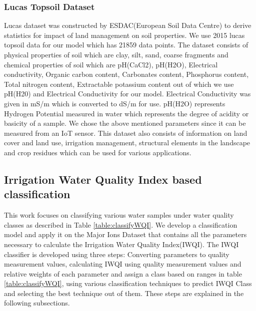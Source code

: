 \subsubsection{Lucas Topsoil Dataset}
\label{subsubsection:lucas}
Lucas dataset  was constructed by ESDAC(European Soil Data Centre) to derive statistics for impact of land management on soil properties\cite{dataset:lucas}. We use 2015 lucas topsoil data for our model which has 21859 data points. The dataset consists of physical properties of soil which are clay, silt, sand, coarse fragments and chemical properties of soil which are pH(CaCl2), pH(H2O), Electrical conductivity, Organic carbon content, Carbonates content, Phosphorus content, Total nitrogen content, Extractable potassium content out of which we use pH(H20) and Electrical Conductivity for our model. Electrical Conductivity was given in mS/m which is converted to dS/m for use. pH(H2O) represents Hydrogen Potential measured in water which represents the degree of acidity or basicity of a sample. We chose the above mentioned parameters since it can be measured from an IoT sensor. This dataset also consists of information on land cover and land use, irrigation management, structural elements in the landscape and crop residues which can be used for various applications.

\subsection{Irrigation Water Quality Index based classification}
\label{subsection:iwqiClassification}
This work focuses on classifying various water samples under water quality classes as described in Table \ref{table:classifyWQI}. We develop a classification model and apply it on the Major Ions Dataset that contains all the parameters necessary to calculate the Irrigation Water Quality Index(IWQI). The IWQI classifier is developed using three steps: Converting parameters to quality measurement values, calculating IWQI using quality measurement values and relative weights of each parameter and assign a class based on ranges in table \ref{table:classifyWQI}, using various classification techniques to predict IWQI Class and selecting the best technique out of them. These steps are explained in the following subsections. 

